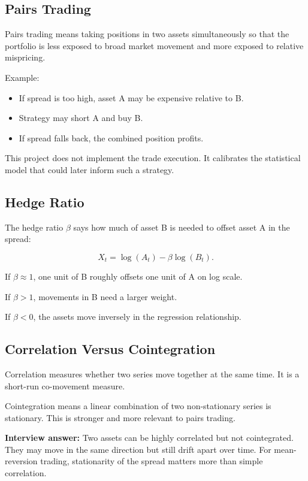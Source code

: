 \documentclass[11pt]{article}
\begin{document}
\subsection{Pairs Trading}

Pairs trading means taking positions in two assets simultaneously so that the
portfolio is less exposed to broad market movement and more exposed to relative
mispricing.

Example:

\begin{itemize}
  \item If spread is too high, asset A may be expensive relative to B.
  \item Strategy may short A and buy B.
  \item If spread falls back, the combined position profits.
\end{itemize}

This project does not implement the trade execution. It calibrates the
statistical model that could later inform such a strategy.

\subsection{Hedge Ratio}

The hedge ratio $\beta$ says how much of asset B is needed to offset asset A in
the spread:

\[
X_t = \log(A_t) - \beta \log(B_t).
\]

If $\beta \approx 1$, one unit of B roughly offsets one unit of A on log scale.

If $\beta > 1$, movements in B need a larger weight.

If $\beta < 0$, the assets move inversely in the regression relationship.

\subsection{Correlation Versus Cointegration}

Correlation measures whether two series move together at the same time. It is a
short-run co-movement measure.

Cointegration means a linear combination of two non-stationary series is
stationary. This is stronger and more relevant to pairs trading.

\textbf{Interview answer:} Two assets can be highly correlated but not
cointegrated. They may move in the same direction but still drift apart over
time. For mean-reversion trading, stationarity of the spread matters more than
simple correlation.
\end{document}
